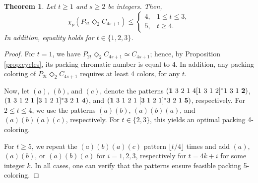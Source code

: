 \documentclass{article}
\newtheorem{theorem}{Theorem}
\begin{document}


\begin{theorem}
    Let $t\geq 1$ and $s\geq 2$ be integers. Then,
    $$\chi_p(P_{2t}\Diamond_2 C_{4s+1})\leq\left\{
\begin{array}{ll}
4, & 1\leq t \leq 3,\\
5, & t \geq 4.
\end{array}\right.
$$
In addition, equality holds for $t\in\{1,2,3\}$. 
\end{theorem}
\begin{proof}
For $t=1$, we have $P_{2t}\Diamond_2 C_{4s+1} \simeq C_{4s+1}$; hence, by Proposition \ref{prop:cycles}, its packing chromatic number is equal to 4. In addition, any packing coloring of $P_{2t}\Diamond_2 C_{4s+1}$ requires at least 4 colors, for any $t$. 

\noindent Now, let $(a)$, $(b)$, and $(c)$, denote the patterns
$({\bf 1}\ 3\ 2\ 1\ 4[1\ 3\ 1\ 2]^*1\ 3\ 1\ {\bf 2})$, $({\bf 1}\ 3\ 1\ 2\ 1\ [3\ 1\ 2\ 1]^*3\ 2\ 1\ {\bf 4})$, and $({\bf 1}\ 3\ 1\ 2\ 1\ [3\ 1\ 2\ 1]^*3\ 2\ 1\ {\bf 5})$, respectively.
For $2 \leq t \leq 4$, we use the patterns $(a)(b)$, $(a)(b)(a)$, and $(a)(b)(a)(c)$, respectively. For $t \in \{2, 3\}$, this yields an optimal packing 4-coloring.

\noindent For $t\geq 5$, we repeat the $(a)(b)(a)(c)$ pattern $\lfloor t/4\rfloor $ times and add $(a)$, $(a)(b)$, or $(a)(b)(a)$ for $i = 1, 2, 3$, respectively for $t = 4k + i$ for some integer $k$. In all cases, one can verify that the patterns ensure feasible packing 5-coloring. 
\end{proof}


\end{document}
